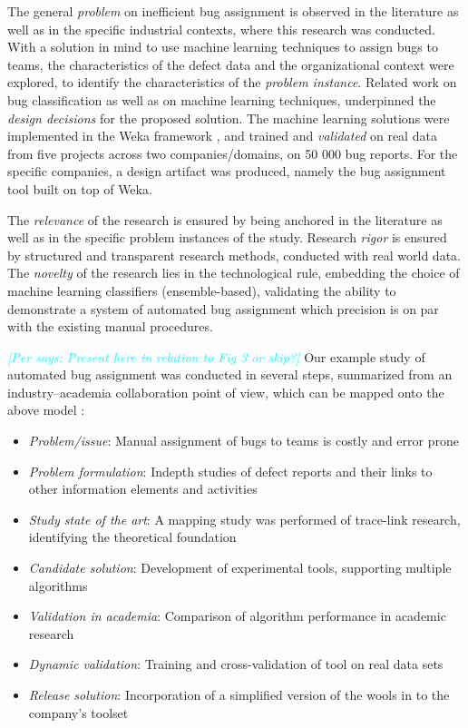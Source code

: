 \documentclass[graybox]{svmult}
\newcommand{\per}[1]{\textcolor{cyan}{{\it [Per says: #1]}}}
\newcommand{\per}[1]{}
\begin{document}
The general \emph{problem} on inefficient bug assignment is observed in the literature as well as in the specific industrial contexts, where this research was conducted. With a solution in mind to use machine learning techniques to assign bugs to teams, the characteristics of the defect data and the organizational context were explored, to identify the characteristics of the \emph{problem instance}. Related work on bug classification as well as on machine learning techniques, underpinned the \emph{design decisions} for the proposed solution. The machine learning solutions were implemented in the Weka framework \cite{hall_weka_2009}, and trained and \emph{validated} on real data from five projects across two companies/domains, on 50 000 bug reports. For the specific companies, a design artifact was produced, namely the bug assignment tool built on top of Weka.

The \emph{relevance} of the research is ensured by being anchored in the literature as well as in the specific problem instances of the study. Research \emph{rigor} is ensured by structured and transparent research methods, conducted with real world data. The \emph{novelty} of the research lies in the technological rule, embedding the choice of machine learning classifiers (ensemble-based), validating the ability to demonstrate a system of automated bug assignment which precision is on par with the existing manual procedures.

\per{Present here in relation to Fig 3 or skip?}
Our example study of automated bug assignment was conducted in several steps, summarized from an industry--academia collaboration point of view, which can be mapped onto the above model \cite{CarverIEEESW2018}:
\begin{itemize}
\item \emph{Problem/issue}: Manual assignment of bugs to teams is costly and error prone
\item \emph{Problem formulation}: Indepth studies of defect reports and their links to other information elements and activities
\item \emph{Study state of the art}: A mapping study was performed of trace-link research, identifying the theoretical foundation \cite{Borg2013EMSE}
\item \emph{Candidate solution}: Development of experimental tools, supporting multiple algorithms
\item \emph{Validation in academia}: Comparison of algorithm performance in academic research \cite{BorgESEM13}
\item \emph{Dynamic validation}: Training and cross-validation of tool on real data sets \cite{JonssonBug15}
\item \emph{Release solution}: Incorporation of a simplified version of the wools in to the company's toolset
\end{itemize} 
\end{document}
